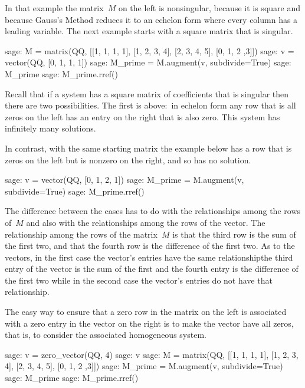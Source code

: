 In that example the matrix~$M$ on the left is nonsingular, because it is 
square and because Gauss's Method reduces it to an 
echelon form where every
column has a leading variable.
The next example starts with a
square matrix that is singular. 
\begin{sagecommandline}
sage: M = matrix(QQ, [[1, 1, 1, 1], [1, 2, 3, 4], [2, 3, 4, 5], [0, 1, 2 ,3]]) 
sage: v = vector(QQ, [0, 1, 1, 1]) 
sage: M_prime = M.augment(v, subdivide=True)
sage: M_prime
sage: M_prime.rref()
\end{sagecommandline}
Recall that if a system has a square matrix of coefficients 
that is singular then there are two possibilities.
The first is above:~in echelon form
any row that is all zeros on the
left has an entry on the right that is also zero.
This system has infinitely many solutions.

In contrast, with the same starting matrix
the example below has a row that is zeros on the left but is nonzero
on the right, and so has no solution.
\begin{sagecommandline} 
sage: v = vector(QQ, [0, 1, 2, 1])             
sage: M_prime = M.augment(v, subdivide=True)
sage: M_prime.rref()                        
\end{sagecommandline}

The difference between the cases
has to do with the relationships among  
the rows of~$M$ and also with the relationships among the rows of the vector.
The relationship among the rows of the matrix~$M$
is that the third row is the sum of the first two, and that the fourth
row is the difference of the first two.
As to the vectors, in the first case the vector's entries have the same 
relationship\Dash the third entry of the vector is the sum of the first 
and the fourth entry is the difference of the first two\Dash  
while in the second case the vector's entries do not have that relationship.

The easy way to ensure that a zero row in the matrix 
on the left is associated with a zero
entry in the vector on the right is to make the vector have all zeros, that is,
to consider the associated homogeneous system.
\begin{sagecommandline}
sage: v = zero_vector(QQ, 4)
sage: v
sage: M = matrix(QQ, [[1, 1, 1, 1], [1, 2, 3, 4], [2, 3, 4, 5], [0, 1, 2 ,3]]) 
sage: M_prime = M.augment(v, subdivide=True)
sage: M_prime
sage: M_prime.rref()
\end{sagecommandline}

